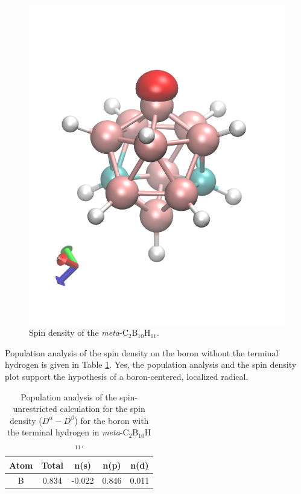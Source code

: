 \documentclass{article}
\begin{document}
\begin{figure}[H]
  \centering
  \includegraphics[scale=0.35]{spin_dens.png}
  \caption{Spin density of the \textit{meta}-C$_2$B$_{10}$H$_{11}$.}
  \label{fig:spin}
\end{figure}

{\color{blue} Population analysis of the spin density on the boron without
  the terminal hydrogen is given in Table \ref{tab:pop}. Yes, the population
  analysis and the spin density plot support the hypothesis of a boron-centered,
  localized radical.
}

\begin{table}[H]
  \centering
  \caption{Population analysis of the spin-unrestricted calculation
    for the spin density ($D^{\alpha}-D^{\beta}$) for the boron with the
    terminal hydrogen in \textit{meta}-C$_2$B$_{10}$H$_{11}$.}
  \begin{tabular}{ccccc}
    Atom & Total & n(s) & n(p) & n(d) \\
    \hline
    B & 0.834 & -0.022 & 0.846 & 0.011
  \end{tabular}
  \label{tab:pop}
\end{table}
\end{document}
